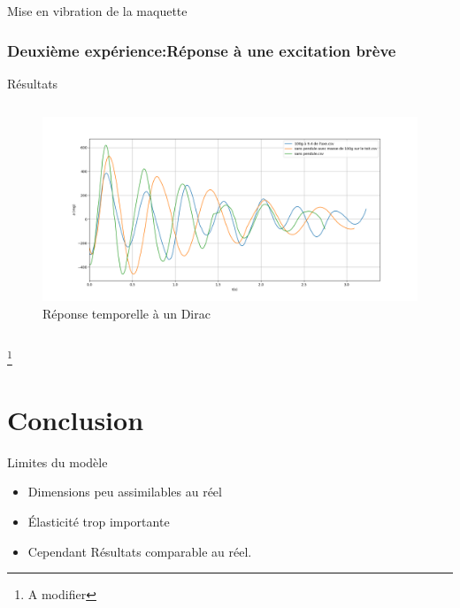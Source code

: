 \documentclass{beamer}
\begin{document}
	
	\begin{frame}{Mise en vibration de la maquette}
		\frametitle{Deuxième expérience:Réponse à une excitation brève}
		\centering Résultats
		\vspace{12pt}
		\begin{columns}[onlytextwidth]
			\begin{column}{1\textwidth}
				\centering
				\begin{figure}
					\includegraphics[width=1\textwidth]{Image/Dirac.png}
					\caption{Réponse temporelle à un Dirac}
				\end{figure}
				
			\end{column}
		\end{columns}
		\footnote{A modifier}
	\end{frame}
	
	
	
	
	

	
	
			
	
	\section{Conclusion}
	
	\begin{frame}{Limites du modèle}
		\begin{itemize}
			\item Dimensions peu assimilables au réel
			\item Élasticité trop importante 
			\item Cependant Résultats comparable au réel.
		\end{itemize}	
		\vspace{12pt}
		
	\end{frame}
	
\end{document}
